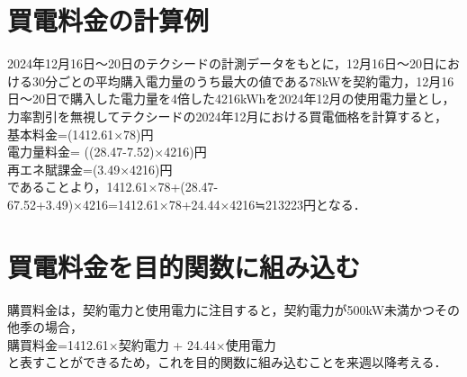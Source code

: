 \documentclass{jarticle}
\begin{document}
\section{買電料金の計算例}
2024年12月16日〜20日のテクシードの計測データをもとに，12月16日〜20日における30分ごとの平均購入電力量のうち最大の値である78kWを契約電力，12月16日〜20日で購入した電力量を4倍した4216kWhを2024年12月の使用電力量とし，力率割引を無視してテクシードの2024年12月における買電価格を計算すると，\\
基本料金=(1412.61×78)円\\
電力量料金= ((28.47-7.52)×4216)円\\
再エネ賦課金=(3.49×4216)円\\
であることより，1412.61×78+(28.47-67.52+3.49)×4216=1412.61×78+24.44×4216≒213223円となる．

\section{買電料金を目的関数に組み込む}
購買料金は，契約電力と使用電力に注目すると，契約電力が500kW未満かつその他季の場合，\\
購買料金=1412.61×契約電力 + 24.44×使用電力\\
と表すことができるため，これを目的関数に組み込むことを来週以降考える．
\end{document}
